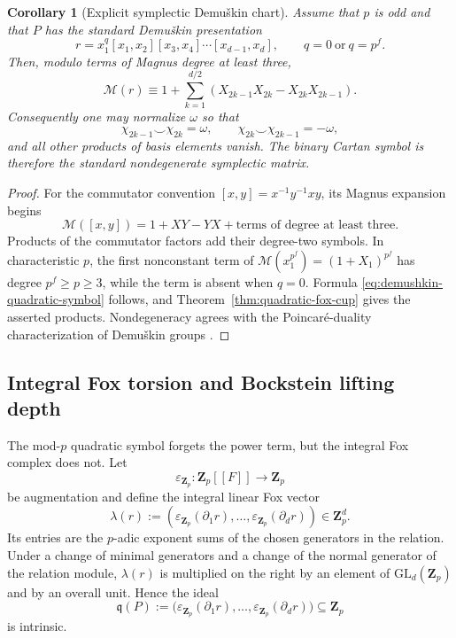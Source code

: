 \documentclass[11pt]{article}
\newtheorem{corollary}[theorem]{Corollary}
\theoremstyle{definition}
\newcommand{\Zp}{\mathbf Z_p}
\begin{document}
\begin{corollary}[Explicit symplectic Demu\v{s}kin chart]\label{cor:demushkin-symplectic-chart}
Assume that $p$ is odd and that $P$ has the standard Demu\v{s}kin presentation
\begin{equation}\label{eq:standard-demushkin-relator}
r
=
x_1^q[x_1,x_2][x_3,x_4]\cdots[x_{d-1},x_d],
\qquad
q=0\ \text{or}\ q=p^f.
\end{equation}
Then, modulo terms of Magnus degree at least three,
\begin{equation}\label{eq:demushkin-quadratic-symbol}
\mathcal M(r)
\equiv
1+
\sum_{k=1}^{d/2}
\left(
X_{2k-1}X_{2k}-X_{2k}X_{2k-1}
\right).
\end{equation}
Consequently one may normalize $\omega$ so that
\[
\chi_{2k-1}\smile\chi_{2k}=\omega,
\qquad
\chi_{2k}\smile\chi_{2k-1}=-\omega,
\]
and all other products of basis elements vanish.  The binary Cartan symbol is therefore the standard nondegenerate symplectic matrix.
\end{corollary}

\begin{proof}
For the commutator convention $[x,y]=x^{-1}y^{-1}xy$, its Magnus expansion begins
\[
\mathcal M([x,y])
=1+XY-YX+\text{terms of degree at least three}.
\]
Products of the commutator factors add their degree-two symbols.  In characteristic $p$, the first nonconstant term of $\mathcal M(x_1^{p^f})=(1+X_1)^{p^f}$ has degree $p^f\ge p\ge3$, while the term is absent when $q=0$.  Formula \eqref{eq:demushkin-quadratic-symbol} follows, and Theorem~\ref{thm:quadratic-fox-cup} gives the asserted products.  Nondegeneracy agrees with the Poincar\'e-duality characterization of Demu\v{s}kin groups \cite{LabuteClassification}.
\end{proof}


\subsection{Integral Fox torsion and Bockstein lifting depth}

The mod-$p$ quadratic symbol forgets the power term, but the integral Fox complex does not.  Let
\[
\varepsilon_{\Zp}:\Zp[[F]]\longrightarrow\Zp
\]
be augmentation and define the integral linear Fox vector
\begin{equation}\label{eq:integral-linear-fox-vector}
\lambda(r)
:=
\left(
\varepsilon_{\Zp}(\partial_1r),\ldots,
\varepsilon_{\Zp}(\partial_dr)
\right)
\in\Zp^d.
\end{equation}
Its entries are the $p$-adic exponent sums of the chosen generators in the relation.  Under a change of minimal generators and a change of the normal generator of the relation module, $\lambda(r)$ is multiplied on the right by an element of $\mathrm{GL}_d(\Zp)$ and by an overall unit.  Hence the ideal
\begin{equation}\label{eq:integral-relation-ideal}
\mathfrak q(P)
:=
\bigl(
\varepsilon_{\Zp}(\partial_1r),\ldots,
\varepsilon_{\Zp}(\partial_dr)
\bigr)
\subseteq\Zp
\end{equation}
is intrinsic.
\end{document}
